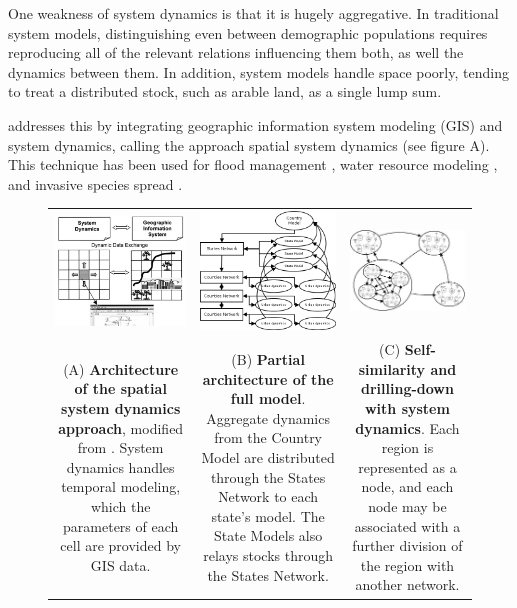 \documentclass[12pt, oneside]{amsart}
\begin{document}
One weakness of system dynamics is that it is hugely aggregative.  In traditional system models, distinguishing even between demographic populations requires reproducing all of the relevant relations influencing them both, as well the dynamics between them.  In addition, system models handle space poorly, tending to treat a distributed stock, such as arable land, as a single lump sum.

\cite{ahmad2004spatial} addresses this by integrating geographic information system modeling (GIS) and system dynamics, calling the approach spatial system dynamics (see figure A).  This technique has been used for flood management \citep{ahmad2006intelligent}, water resource modeling \citep{vivoni2009semiarid, roach2009compartmental}, and invasive species spread \citep{bendor2006spatial}.
\begin{figure}[tb]
\begin{tabular}{ccc}
  \includegraphics[width=2in]{ssdarch-mod2.png} & 
  \includegraphics[width=2in]{architecture.png} &
  \includegraphics[width=2in]{selfsimodel.jpeg} \\
  \parbox[t]{2in}{(A) {\bf Architecture of the spatial system dynamics approach}, modified from \cite{ahmad2004spatial}.  System dynamics handles temporal modeling, which the parameters of each cell are provided by GIS data.} &
  \parbox[t]{2in}{(B) {\bf Partial architecture of the full model}.  Aggregate dynamics from the Country Model are distributed through the States Network to each state's model.  The State Models also relays stocks through the States Network.} &
  \parbox[t]{2in}{(C) {\bf Self-similarity and drilling-down with system dynamics}.  Each region is represented as a node, and each node may be associated with a further division of the region with another network.}
\end{tabular}
\end{figure}
\end{document}
